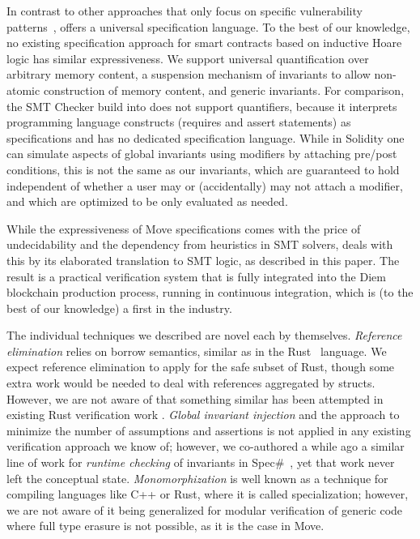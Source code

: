 
In contrast to other approaches that only focus on specific vulnerability
patterns~\cite{mythril,oyente,maian,securify}, \MVP offers a universal
specification language. To the best of our knowledge, no existing specification
approach for smart contracts based on inductive Hoare logic has similar
expressiveness. We support universal quantification over arbitrary memory
content, a suspension mechanism of invariants to allow non-atomic construction
of memory content, and generic invariants.  For comparison, the SMT Checker
build into \solidity \cite{solidity,solcverify,DBLP:conf/esop/HajduJ20}
does not support quantifiers, because it interprets programming language
constructs (requires and assert statements) as specifications and has no
dedicated specification language. While in Solidity one can simulate aspects of
global invariants using modifiers by attaching pre/post conditions, this is not
the same as our invariants, which are guaranteed to hold independent of whether
a user may or (accidentally) may not attach a modifier, and which are optimized
to be only evaluated as needed.

While the expressiveness of Move specifications comes with the price of
undecidability and the dependency from heuristics in SMT solvers, \MVP deals
with this by its elaborated translation to SMT logic, as described in this
paper. The result is a practical verification system that is fully integrated
into the Diem blockchain production process, running in continuous integration,
which is (to the best of our knowledge) a first in the industry.

The individual techniques we described are novel each by
themselves. \emph{Reference elimination} relies on borrow semantics, similar as
in the Rust~\cite{rust} language.  We expect reference elimination to apply for
the safe subset of Rust, though some extra work would be needed to deal with
references aggregated by structs.  However, we are not aware of that something
similar has been attempted in existing Rust verification work
\cite{prusti,smack,nopanic,crust}. \emph{Global invariant injection} and the
approach to minimize the number of assumptions and assertions is not applied in
any existing verification approach we know of; however, we co-authored a while
ago a similar line of work for \emph{runtime checking} of invariants in
Spec\#~\cite{StateConstraintsPatent}, yet that work never left the conceptual
state. \emph{Monomorphization} is well known as a technique for compiling
languages like C++ or Rust, where it is called specialization; however, we are
not aware of it being generalized for modular verification of generic code where
full type erasure is not possible, as it is the case in Move.


